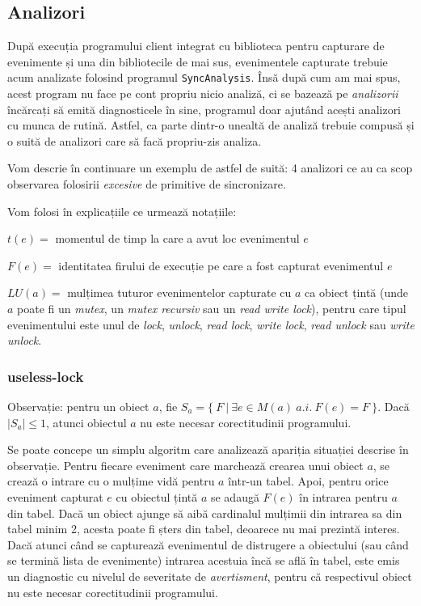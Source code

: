 \subsection{Analizori}\label{analyzers}

După execuția programului client integrat cu biblioteca pentru capturare
de evenimente și una din bibliotecile de mai sus, evenimentele capturate
trebuie acum analizate folosind programul \lstinline{SyncAnalysis}. Însă
după cum am mai spus, acest program nu face pe cont propriu nicio
analiză, ci se bazează pe \textit{analizorii} încărcați să emită
diagnosticele în sine, programul doar ajutând acești analizori cu munca
de rutină. Astfel, ca parte dintr-o unealtă de analiză trebuie compusă
și o suită de analizori care să facă propriu-zis analiza.

Vom descrie în continuare un exemplu de astfel de suită: 4 analizori ce
au ca scop observarea folosirii \textit{excesive} de primitive de
sincronizare.

Vom folosi în explicațiile ce urmează notațiile:

$t(e)=$ momentul de timp la care a avut loc evenimentul $e$

$F(e)=$ identitatea firului de execuție pe care a fost capturat
evenimentul $e$

$LU(a)=$ mulțimea tuturor evenimentelor capturate cu $a$ ca obiect țintă
(unde $a$ poate fi un \textit{mutex}, un \textit{mutex recursiv} sau un
\textit{read write lock}), pentru care tipul evenimentului este unul de
\textit{lock}, \textit{unlock}, \textit{read lock}, \textit{write lock},
\textit{read unlock} sau \textit{write unlock}.

\subsubsection{useless-lock}

Observație: pentru un obiect $a$, fie
$S_a = \{\ F\ |\ \exists e \in M(a) \ a.i.\ F(e) = F\ \}$. Dacă
$|S_a| \leq 1$, atunci obiectul $a$ nu este necesar corectitudinii
programului.

Se poate concepe un simplu algoritm care analizează apariția situației
descrise în observație. Pentru fiecare eveniment care marchează crearea
unui obiect $a$, se crează o intrare cu o mulțime vidă pentru $a$
într-un tabel. Apoi, pentru orice eveniment capturat $e$ cu obiectul
țintă $a$ se adaugă $F(e)$ în intrarea pentru $a$ din tabel. Dacă un
obiect ajunge să aibă cardinalul mulțimii din intrarea sa din tabel
minim 2, acesta poate fi șters din tabel, deoarece nu mai prezintă
interes. Dacă atunci când se capturează evenimentul de distrugere a
obiectului (sau când se termină lista de evenimente) intrarea acestuia
încă se află în tabel, este emis un diagnostic cu nivelul de severitate
de \textit{avertisment}, pentru că respectivul obiect nu este necesar
corectitudinii programului.

